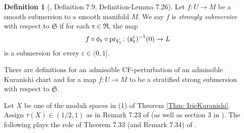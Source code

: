 \documentclass[10pt]{amsart}
\numberwithin{equation}{section}
\theoremstyle{plain}
\theoremstyle{definition}
\newtheorem{definition}[theorem]{Definition}
\theoremstyle{remark}
\numberwithin{equation}{section}
\newcommand{\mf}[1]{\mathfrak{#1}}
\begin{document}
{\begin{definition}[\cite{FOOO20book}, Definition 7.9, Definition-Lemma 7.26]
	Let $f\colon U\to M$ be a smooth submersion to a smooth manifold $M$.
	We say $f$ is \emph{strongly submersive} with respect to $\mf{S}$ if for each $\mf{r}\in \mf{R}$, the map \begin{align*}
		f\circ \phi_\mf{r}\circ \textup{pr}_{V_\mf{r}}\colon (\mf{s}_\mf{r}^\varepsilon)^{-1}(0) \to L
	\end{align*}
	is a submersion for every $\varepsilon\in (0,1]$.
\end{definition}

There are definitions for an admissible CF-perturbation  of an admissible Kuranishi chart and for a map $f\colon U\to M$ to be a stratified strong submersion with respect to $\mf{S}$.

\bigskip
Let $X$ be one of the moduli spaces in (1) of  Theorem \ref{Thm: IrieKuranishi}. Assign $\tau(X)\in (1/2,1)$ as in Remark 7.23 of \cite{Irie2} (as well as section 3 in \cite{IrieErratum}).
The following plays the role of Theorem 7.33 (and Remark 7.34) of \cite{Irie2}.



}
\end{document}
